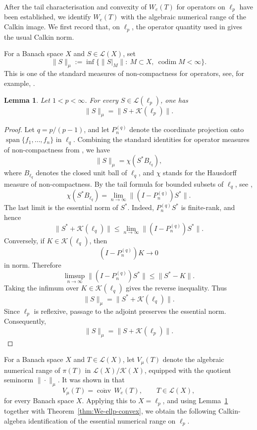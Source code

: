 \documentclass[11pt]{amsart}
\numberwithin{equation}{section}
\newtheorem{lemma}[theorem]{Lemma}
\theoremstyle{definition}
\theoremstyle{remark}
\DeclareMathOperator{\conv}{conv}
\begin{document}
After the tail characterisation and convexity of \(W_e(T)\) for operators on
\(\ell_p\) have been established, we identify \(W_e(T)\) with the algebraic
numerical range of the Calkin image. We first record that, on \(\ell_p\), the
operator quantity used in \cite{BM} gives the usual Calkin norm.

For a Banach space \(X\) and \(S\in\mathcal L(X)\), set
\begin{equation}\label{eq:mu-seminorm}
        \|S\|_\mu
        :=
        \inf\{\|S|_M\|:\ M\subset X,\ \operatorname{codim}M<\infty\}.
\end{equation}
This is one of the standard measures of non-compactness for operators, see,
for example, \cite[Chapter~24]{MullerBook}.

\begin{lemma}\label{lem:mu-essential-lp}
Let \(1<p<\infty\). For every \(S\in\mathcal L(\ell_p)\), one has
\[
        \|S\|_\mu=\|S+\mathcal K(\ell_p)\|.
\]
\end{lemma}

\begin{proof}
Let \(q=p/(p-1)\), and let \(P_n^{(q)}\) denote the coordinate projection
onto \(\operatorname{span}\{f_1,\ldots,f_n\}\) in \(\ell_q\). Combining the
standard identities for operator measures of non-compactness from
\cite[Chapter~24]{MullerBook}, we have
\[
        \|S\|_\mu=\chi(S^*B_{\ell_q}),
\]
where \(B_{\ell_q}\) denotes the closed unit ball of \(\ell_q\), and
\(\chi\) stands for the Hausdorff measure of non-compactness. By the tail
formula for bounded subsets of \(\ell_q\), see
\cite[Theorem~5.18(a)]{BanasMursaleen},
\[
        \chi(S^*B_{\ell_q})
        =
        \lim_{n\to\infty}\|(I-P_n^{(q)})S^*\|.
\]
The last limit is the essential norm of \(S^*\). Indeed, \(P_n^{(q)}S^*\) is
finite-rank, and hence
\[
        \|S^*+\mathcal K(\ell_q)\|
        \le
        \lim_{n\to\infty}\|(I-P_n^{(q)})S^*\|.
\]
Conversely, if \(K\in\mathcal K(\ell_q)\), then
\[
        (I-P_n^{(q)})K\to0
\]
in norm. Therefore
\[
        \limsup_{n\to\infty}\|(I-P_n^{(q)})S^*\|
        \le
        \|S^*-K\|.
\]
Taking the infimum over \(K\in\mathcal K(\ell_q)\) gives the reverse
inequality. Thus
\[
        \|S\|_\mu=\|S^*+\mathcal K(\ell_q)\|.
\]
Since \(\ell_p\) is reflexive, passage to the adjoint preserves the essential
norm. Consequently,
\[
        \|S\|_\mu=\|S+\mathcal K(\ell_p)\|.
\]
\end{proof}



For a Banach space \(X\) and \(T\in\mathcal L(X)\), let \(V_\mu(T)\)
denote the algebraic numerical range of \(\pi(T)\) in
\(\mathcal L(X)/\mathcal K(X)\), equipped with the quotient seminorm
\(\|\cdot\|_\mu\).
It was shown in \cite[Theorem~8]{BM} that
\begin{equation}\label{vmu}
        V_\mu(T)=\overline{\conv}\, W_e(T),
        \qquad T\in\mathcal L(X),
\end{equation}
for every Banach space \(X\). Applying this to
\(X=\ell_p\), and using Lemma~\ref{lem:mu-essential-lp} together with
Theorem~\ref{thm:We-ellp-convex}, we obtain the following Calkin-algebra
identification of the essential numerical range on \(\ell_p\).
\end{document}

